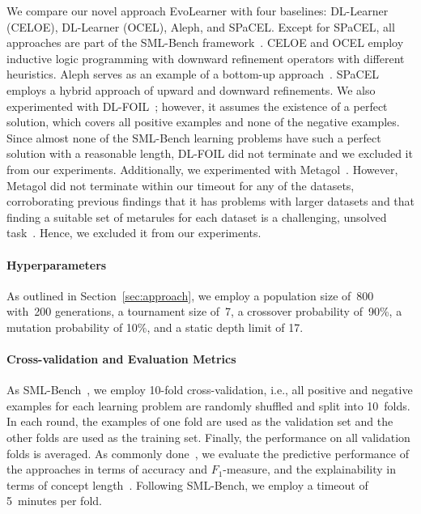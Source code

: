We compare our novel approach EvoLearner with four baselines: DL-Learner (CELOE), DL-Learner (OCEL), Aleph, and SPaCEL\@. Except for SPaCEL, all approaches are part of the SML-Bench framework~\citep{Westphal2019SML-Bench}. CELOE and OCEL employ inductive logic programming with downward refinement operators with different heuristics. Aleph serves as an example of a bottom-up approach~\citep{Muggleton1995Inverse}. SPaCEL~\citep{Tran2017Parallel} employs a hybrid approach of upward and downward refinements. We also experimented with DL-FOIL~\citep{Fanizzi2008DL-FOIL,Fanizzi2018DLFoil,Rizzo2020DL-Foil}; however, it assumes the existence of a perfect solution, which covers all positive examples and none of the negative examples. Since almost none of the SML-Bench learning problems have such a perfect solution with a reasonable length, DL-FOIL did not terminate and we excluded it from our experiments. Additionally, we experimented with Metagol~\citep{Muggleton2013MetainterpretiveLA}. However, Metagol did not terminate within our timeout for any of the datasets, corroborating previous findings that it has problems with larger datasets and that finding a suitable set of metarules for each dataset is a challenging, unsolved task~\citep{Dumancic2020Comparative,Cropper2020Inductive}. Hence, we excluded it from our experiments.

\paragraph{Hyperparameters}
As outlined in Section~\ref{sec:approach}, we employ a population size of~800 with~200 generations, a tournament size of~7, a crossover probability of~90\%, a mutation probability of 10\%, and a static depth limit of 17.

\paragraph{Cross-validation and Evaluation Metrics}
As SML-Bench~\citep{Westphal2019SML-Bench}, we employ 10-fold cross-validation, i.e., all positive and negative examples for each learning problem are randomly shuffled and split into 10~folds. In each round, the examples of one fold are used as the validation set and the other folds are used as the training set. Finally, the performance on all validation folds is averaged. As commonly done~\citep{Westphal2019SML-Bench}, we evaluate the predictive performance of the approaches in terms of accuracy and $F_1$-measure, and the explainability in terms of concept length~\citep{Tran2017Parallel}. Following SML-Bench, we employ a timeout of 5~minutes per fold.

